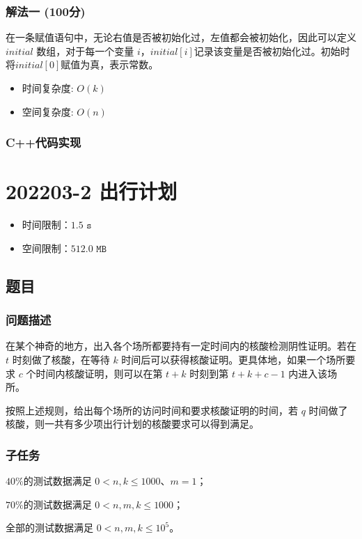 \documentclass[UTF8, 12pt, a4paper, oneside]{ctexart}
\begin{document}
\subsubsection{解法一 (100分)}
\par 在一条赋值语句中，无论右值是否被初始化过，左值都会被初始化，因此可以定义 $initial$ 数组，对于每一个变量 $i$，$initial[i]$记录该变量是否被初始化过。初始时将$initial[0]$赋值为真，表示常数。
\begin{itemize}
    \item 时间复杂度: $O(k)$
    \item 空间复杂度: $O(n)$
\end{itemize}
\subsubsection{C++代码实现}



\section{202203-2 出行计划}
\begin{itemize}
    \item 时间限制：$1.5\texttt{ s}$
    \item 空间限制：$512.0\texttt{ MB}$
\end{itemize}
\subsection{题目}
\subsubsection{问题描述}
\par 在某个神奇的地方，出入各个场所都要持有一定时间内的核酸检测阴性证明。若在 $t$ 时刻做了核酸，在等待 $k$ 时间后可以获得核酸证明。更具体地，如果一个场所要求 $c$ 个时间内核酸证明，则可以在第 $t + k$ 时刻到第 $t + k + c - 1$ 内进入该场所。
\par 按照上述规则，给出每个场所的访问时间和要求核酸证明的时间，若 $q$ 时间做了核酸，则一共有多少项出行计划的核酸要求可以得到满足。
\subsubsection{子任务}
\par $40\%$的测试数据满足 $0 < n,k \leq 1000$、$m = 1$；
\par $70\%$的测试数据满足 $0 < n,m,k \leq 1000$；
\par 全部的测试数据满足 $0 < n,m,k \leq 10^5$。
\end{document}

